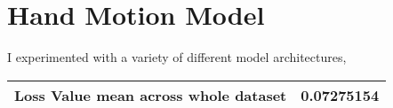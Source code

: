 \chapter{Hand Motion Model}
\label{C:hand-model}


I experimented with a variety of different model architectures,


\begin{tabular}{ | c | c |}
    \hline
    Loss Value mean across whole dataset & 0.07275154 \\
    \hline
\end{tabular}
